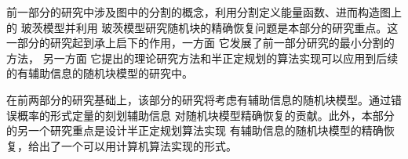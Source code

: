 前一部分的研究中涉及图中的分割的概念，利用分割定义能量函数、进而构造图上的 玻茨模型并利用
玻茨模型研究随机块的精确恢复问题是本部分的研究重点。这一部分的研究起到承上启下的作用，一方面
它发展了前一部分研究的最小分割的方法，
另一方面
它提出的理论研究方法和半正定规划的算法实现可以应用到后续的有辅助信息的随机块模型的研究中。

在前两部分的研究基础上，该部分的研究将考虑有辅助信息的随机块模型。通过错误概率的形式定量的刻划辅助信息
对随机块模型精确恢复的贡献。此外，本部分的另一个研究重点是设计半正定规划算法实现
有辅助信息的随机块模型的精确恢复，给出了一个可以用计算机算法实现的形式。
